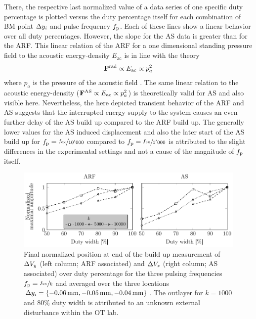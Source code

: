 There, the respective last normalized value of a data series of one specific 
duty percentage is plotted versus the duty percentage itself for each 
combination of BM point $\Delta y_{i}$ and pulse frequency $f_{\mathrm{p}}$. Each of these 
lines show a linear behavior over all duty percentages. However, the slope for 
the AS data is greater than for the ARF. This linear relation of the ARF for a 
one dimensional standing pressure field to the acoustic energy-density 
$E_{\mathrm{ac}}$ is in line with the theory
\begin{equation*}
  \vb{F}^{\mathrm{rad}}\propto E_{\mathrm{ac}} \propto p_{a}^{2}
\end{equation*}
where $p_{a}$ is the pressure of the acoustic field 
\cite{Gorkov1962,Bruus2012}. The same linear relation to the acoustic 
energy-density ($\vb{F}^{\mathrm{AS}}\propto E_{\mathrm{ac}}\propto p_{a}^{2}$) is 
theoretically valid for AS \cite{Bach2020} and also visible here. Nevertheless, 
the here depicted transient behavior of the ARF and AS suggests that the 
interrupted energy supply to the system causes an even further delay of the AS 
build up compared to the ARF build up. The generally lower values for the AS 
induced displacement and also the later start of the AS build up for 
$f_{\mathrm{p}}=\sfrac{f_{\mathrm{ex}}}{10'000}$ compared to $f_{\mathrm{p}}=\sfrac{f_{\mathrm{ex}}}{1'000}$ is attributed 
to the slight differences in the experimental settings and not a cause of the 
magnitude of $f_{\mathrm{p}}$ itself.

\begin{figure}[tbp]
  \centering
  \includegraphics[]{Plots/cache/avg-end-over-duty.pdf}
  \caption{Final normalized position at end of the build up measurement of 
  $\Delta V_{y}$ (left column; ARF associated) and $\Delta V_{z}$ (right column; AS 
  associated) over duty percentage for the three pulsing frequencies 
  $f_{\mathrm{p}}=\sfrac{f_{\mathrm{ex}}}{k}$ and averaged over the three locations $\Dy_{i} =
\{\SI{-0.06}{\mm},\SI{-0.05}{\mm},\SI{-0.04}{\mm}\}$. The outlayer for $k=1000$ 
and 80\% duty width is attributed to an unknown external disturbance within the 
OT lab.}\label{fig:PU-all-duty}
\end{figure}

